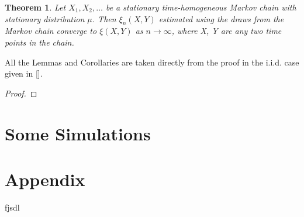 \documentclass{article}
\newtheorem{theorem}{Theorem}[section]
\begin{document}
	\begin{theorem}
		Let $X_1, X_2, \dots$ be a stationary time-homogeneous Markov chain with stationary distribution $\mu$.
		Then $\xi_n(X, Y)$ estimated using the draws from the Markov chain converge to $\xi(X, Y)$ as $n \rightarrow \infty$, where X, Y are any two time points in the chain.
	\end{theorem}
	All the Lemmas and Corollaries are taken directly from the proof in the i.i.d. case given in [].
	\begin{proof}

	\end{proof}


\section{Some Simulations}





\section{Appendix}
fjsdl
\end{document}
